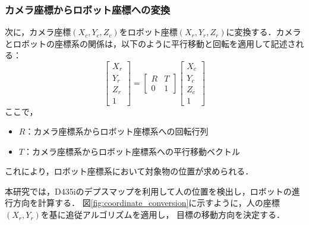\subsubsection{カメラ座標からロボット座標への変換}
次に，カメラ座標$(X_c, Y_c, Z_c)$をロボット座標$(X_r, Y_r, Z_r)$に変換する．カメラとロボットの座標系の関係は，以下のように平行移動と回転を適用して記述される：
\begin{equation}
    \begin{bmatrix}
        X_r \\ Y_r \\ Z_r \\ 1
    \end{bmatrix}
    =
    \begin{bmatrix}
        R & T \\
        0 & 1
    \end{bmatrix}
    \begin{bmatrix}
        X_c \\ Y_c \\ Z_c \\ 1
    \end{bmatrix}
\end{equation}
ここで，
\begin{itemize}
    \item $R$：カメラ座標系からロボット座標系への回転行列
    \item $T$：カメラ座標系からロボット座標系への平行移動ベクトル
\end{itemize}

これにより，ロボット座標系において対象物の位置が求められる．

本研究では，D435iのデプスマップを利用して人の位置を検出し，ロボットの進行方向を計算する．
図\ref{fig:coordinate_conversion}に示すように，人の座標$(X_r, Y_r)$を基に追従アルゴリズムを適用し，
目標の移動方向を決定する．

